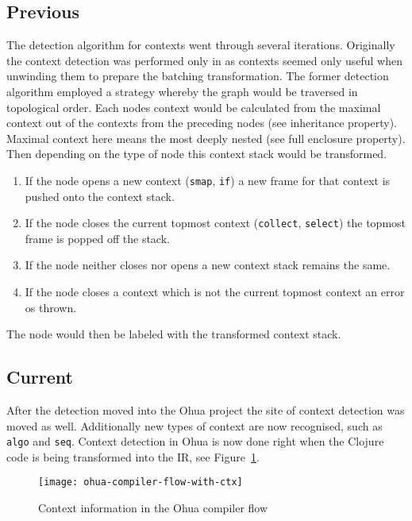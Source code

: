 \subsection{Previous}

The detection algorithm for contexts went through several iterations.
Originally the context detection was performed only in \yauhau{} as contexts seemed only useful when unwinding them to prepare the batching transformation.
The former detection algorithm employed a strategy whereby the graph would be traversed in topological order.
Each nodes context would be calculated from the maximal context out of the contexts from the preceding nodes (see inheritance property).
Maximal context here means the most deeply nested (see full enclosure property).
Then depending on the type of node this context stack would be transformed.

\begin{enumerate}
  \item If the node opens a new context (\texttt{smap}, \texttt{if}) a new frame for that context is pushed onto the context stack.
  \item If the node closes the current topmost context (\texttt{collect}, \texttt{select}) the topmost frame is popped off the stack.
  \item If the node neither closes nor opens a new context stack remains the same.
  \item If the node closes a context which is not the current topmost context an error os thrown.
\end{enumerate}

The node would then be labeled with the transformed context stack.

\subsection{Current}


After the detection moved into the Ohua project the site of context detection was moved as well.
Additionally new types of context are now recognised, such as \texttt{algo} and \texttt{seq}.
Context detection in Ohua is now done right when the Clojure code is being transformed into the IR, see Figure~\ref{fig:ohua-compiler-flow-with-ctx}.

\begin{figure}
  \texttt{[image: ohua-compiler-flow-with-ctx]}
  \caption{Context information in the Ohua compiler flow}
  \label{fig:ohua-compiler-flow-with-ctx}
\end{figure}

